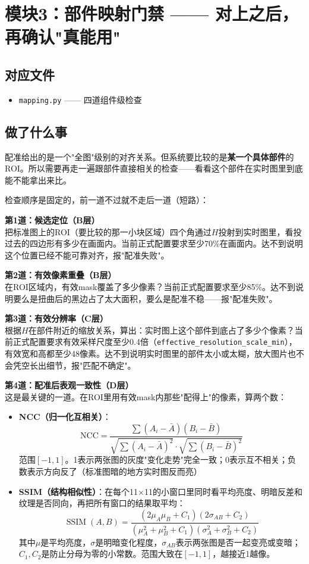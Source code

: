 \documentclass[12pt,a4paper]{ctexart}
\begin{document}
\section{模块3：部件映射门禁 —— 对上之后，再确认"真能用"}

\subsection*{对应文件}
\begin{itemize}
\item \texttt{mapping.py} —— 四道组件级检查
\end{itemize}

\subsection*{做了什么事}

配准给出的是一个"全图"级别的对齐关系。但系统要比较的是\textbf{某一个具体部件}的ROI。所以需要再走一遍跟部件直接相关的检查——看看这个部件在实时图里到底能不能拿出来比。

检查顺序是固定的，前一道不过就不走后一道（短路）：

\textbf{第1道：候选定位（B层）}\\[2pt]
把标准图上的ROI（要比较的那一小块区域）四个角通过$H$投射到实时图里，看投过去的四边形有多少在画面内。当前正式配置要求至少70\%在画面内。达不到说明这个位置已经不能可靠对齐，报"配准失败"。

\textbf{第2道：有效像素重叠（B层）}\\[2pt]
在ROI区域内，有效mask覆盖了多少像素？当前正式配置要求至少85\%。达不到说明要么是扭曲后的黑边占了太大面积，要么是配准不稳——报"配准失败"。

\textbf{第3道：有效分辨率（C层）}\\[2pt]
根据$H$在部件附近的缩放关系，算出：实时图上这个部件到底占了多少个像素？当前正式配置要求有效采样尺度至少0.4倍（\texttt{effective\_resolution\_scale\_min}），有效宽和高都至少48像素。达不到说明实时图里的部件太小或太糊，放大图片也不会凭空长出细节，报"匹配不确定"。

\textbf{第4道：配准后表观一致性（D层）}\\[2pt]
这是最关键的一道。在ROI里用有效mask内那些"配得上"的像素，算两个数：

\begin{itemize}
\item \textbf{NCC（归一化互相关）}：\[ \text{NCC} = \frac{\sum(A_i - \bar{A})(B_i - \bar{B})}{\sqrt{\sum(A_i-\bar{A})^2} \cdot \sqrt{\sum(B_i-\bar{B})^2}} \] 范围$[-1,1]$。1表示两张图的灰度"变化走势"完全一致；0表示互不相关；负数表示方向反了（标准图暗的地方实时图反而亮）
\item \textbf{SSIM（结构相似性）}：在每个11×11的小窗口里同时看平均亮度、明暗反差和纹理是否同向，再把所有窗口的结果取平均：\[\operatorname{SSIM}(A,B)=\frac{(2\mu_A\mu_B+C_1)(2\sigma_{AB}+C_2)}{(\mu_A^2+\mu_B^2+C_1)(\sigma_A^2+\sigma_B^2+C_2)}\] 其中$\mu$是平均亮度，$\sigma$是明暗变化程度，$\sigma_{AB}$表示两张图是否一起变亮或变暗；$C_1,C_2$是防止分母为零的小常数。范围大致在$[-1,1]$，越接近1越像。
\end{itemize}
\end{document}
